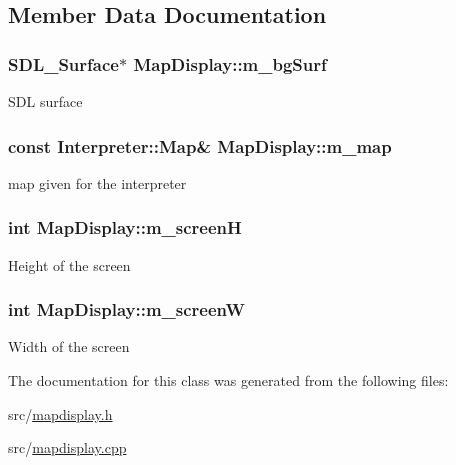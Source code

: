 \subsection{Member Data Documentation}
\hypertarget{classMapDisplay_a8c4cc4b6d6a5f1608ca2a3eb9a5e3290}{
\subsubsection[{m\_\-bgSurf}]{\setlength{\rightskip}{0pt plus 5cm}SDL\_\-Surface$\ast$ {\bf MapDisplay::m\_\-bgSurf}}}
\label{classMapDisplay_a8c4cc4b6d6a5f1608ca2a3eb9a5e3290}
SDL surface \hypertarget{classMapDisplay_a218c5b07ae7b9622a606faa613d7eaa9}{
\subsubsection[{m\_\-map}]{\setlength{\rightskip}{0pt plus 5cm}const {\bf Interpreter::Map}\& {\bf MapDisplay::m\_\-map}}}
\label{classMapDisplay_a218c5b07ae7b9622a606faa613d7eaa9}
map given for the interpreter \hypertarget{classMapDisplay_a3a6a2f7b6501945628fbfe022914daed}{
\subsubsection[{m\_\-screenH}]{\setlength{\rightskip}{0pt plus 5cm}int {\bf MapDisplay::m\_\-screenH}}}
\label{classMapDisplay_a3a6a2f7b6501945628fbfe022914daed}
Height of the screen \hypertarget{classMapDisplay_a31f9d5788c440d1ef0fca5729103ab05}{
\subsubsection[{m\_\-screenW}]{\setlength{\rightskip}{0pt plus 5cm}int {\bf MapDisplay::m\_\-screenW}}}
\label{classMapDisplay_a31f9d5788c440d1ef0fca5729103ab05}
Width of the screen 

The documentation for this class was generated from the following files:\begin{DoxyCompactItemize}
\item 
src/\hyperlink{mapdisplay_8h}{mapdisplay.h}\item 
src/\hyperlink{mapdisplay_8cpp}{mapdisplay.cpp}\end{DoxyCompactItemize}
